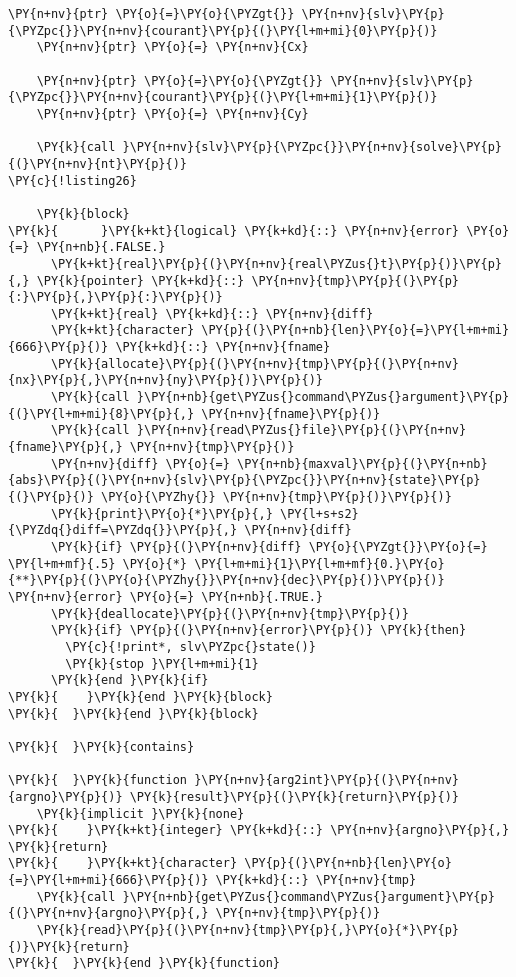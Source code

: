 \begin{Verbatim}[commandchars=\\\{\}]
    \PY{n+nv}{ptr} \PY{o}{=}\PY{o}{\PYZgt{}} \PY{n+nv}{slv}\PY{p}{\PYZpc{}}\PY{n+nv}{courant}\PY{p}{(}\PY{l+m+mi}{0}\PY{p}{)} 
    \PY{n+nv}{ptr} \PY{o}{=} \PY{n+nv}{Cx}

    \PY{n+nv}{ptr} \PY{o}{=}\PY{o}{\PYZgt{}} \PY{n+nv}{slv}\PY{p}{\PYZpc{}}\PY{n+nv}{courant}\PY{p}{(}\PY{l+m+mi}{1}\PY{p}{)} 
    \PY{n+nv}{ptr} \PY{o}{=} \PY{n+nv}{Cy}

    \PY{k}{call }\PY{n+nv}{slv}\PY{p}{\PYZpc{}}\PY{n+nv}{solve}\PY{p}{(}\PY{n+nv}{nt}\PY{p}{)}
\PY{c}{!listing26}

    \PY{k}{block}
\PY{k}{      }\PY{k+kt}{logical} \PY{k+kd}{::} \PY{n+nv}{error} \PY{o}{=} \PY{n+nb}{.FALSE.}
      \PY{k+kt}{real}\PY{p}{(}\PY{n+nv}{real\PYZus{}t}\PY{p}{)}\PY{p}{,} \PY{k}{pointer} \PY{k+kd}{::} \PY{n+nv}{tmp}\PY{p}{(}\PY{p}{:}\PY{p}{,}\PY{p}{:}\PY{p}{)}
      \PY{k+kt}{real} \PY{k+kd}{::} \PY{n+nv}{diff}
      \PY{k+kt}{character} \PY{p}{(}\PY{n+nb}{len}\PY{o}{=}\PY{l+m+mi}{666}\PY{p}{)} \PY{k+kd}{::} \PY{n+nv}{fname}
      \PY{k}{allocate}\PY{p}{(}\PY{n+nv}{tmp}\PY{p}{(}\PY{n+nv}{nx}\PY{p}{,}\PY{n+nv}{ny}\PY{p}{)}\PY{p}{)}
      \PY{k}{call }\PY{n+nb}{get\PYZus{}command\PYZus{}argument}\PY{p}{(}\PY{l+m+mi}{8}\PY{p}{,} \PY{n+nv}{fname}\PY{p}{)}
      \PY{k}{call }\PY{n+nv}{read\PYZus{}file}\PY{p}{(}\PY{n+nv}{fname}\PY{p}{,} \PY{n+nv}{tmp}\PY{p}{)}
      \PY{n+nv}{diff} \PY{o}{=} \PY{n+nb}{maxval}\PY{p}{(}\PY{n+nb}{abs}\PY{p}{(}\PY{n+nv}{slv}\PY{p}{\PYZpc{}}\PY{n+nv}{state}\PY{p}{(}\PY{p}{)} \PY{o}{\PYZhy{}} \PY{n+nv}{tmp}\PY{p}{)}\PY{p}{)}
      \PY{k}{print}\PY{o}{*}\PY{p}{,} \PY{l+s+s2}{\PYZdq{}diff=\PYZdq{}}\PY{p}{,} \PY{n+nv}{diff}
      \PY{k}{if} \PY{p}{(}\PY{n+nv}{diff} \PY{o}{\PYZgt{}}\PY{o}{=} \PY{l+m+mf}{.5} \PY{o}{*} \PY{l+m+mi}{1}\PY{l+m+mf}{0.}\PY{o}{**}\PY{p}{(}\PY{o}{\PYZhy{}}\PY{n+nv}{dec}\PY{p}{)}\PY{p}{)} \PY{n+nv}{error} \PY{o}{=} \PY{n+nb}{.TRUE.}
      \PY{k}{deallocate}\PY{p}{(}\PY{n+nv}{tmp}\PY{p}{)}
      \PY{k}{if} \PY{p}{(}\PY{n+nv}{error}\PY{p}{)} \PY{k}{then}
        \PY{c}{!print*, slv\PYZpc{}state()}
        \PY{k}{stop }\PY{l+m+mi}{1}
      \PY{k}{end }\PY{k}{if}
\PY{k}{    }\PY{k}{end }\PY{k}{block}
\PY{k}{  }\PY{k}{end }\PY{k}{block}

\PY{k}{  }\PY{k}{contains}

\PY{k}{  }\PY{k}{function }\PY{n+nv}{arg2int}\PY{p}{(}\PY{n+nv}{argno}\PY{p}{)} \PY{k}{result}\PY{p}{(}\PY{k}{return}\PY{p}{)}
    \PY{k}{implicit }\PY{k}{none}
\PY{k}{    }\PY{k+kt}{integer} \PY{k+kd}{::} \PY{n+nv}{argno}\PY{p}{,} \PY{k}{return}
\PY{k}{    }\PY{k+kt}{character} \PY{p}{(}\PY{n+nb}{len}\PY{o}{=}\PY{l+m+mi}{666}\PY{p}{)} \PY{k+kd}{::} \PY{n+nv}{tmp}
    \PY{k}{call }\PY{n+nb}{get\PYZus{}command\PYZus{}argument}\PY{p}{(}\PY{n+nv}{argno}\PY{p}{,} \PY{n+nv}{tmp}\PY{p}{)}
    \PY{k}{read}\PY{p}{(}\PY{n+nv}{tmp}\PY{p}{,}\PY{o}{*}\PY{p}{)}\PY{k}{return}
\PY{k}{  }\PY{k}{end }\PY{k}{function}


\end{Verbatim}
